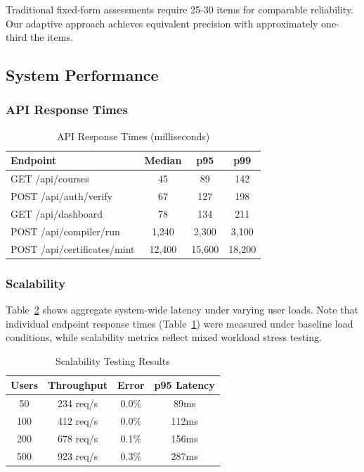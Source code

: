\documentclass[conference]{IEEEtran}
\begin{document}
Traditional fixed-form assessments require 25-30 items for comparable reliability. Our adaptive approach achieves equivalent precision with approximately one-third the items.

\subsection{System Performance}

\subsubsection{API Response Times}

\begin{table}[htbp]
\caption{API Response Times (milliseconds)}
\begin{center}
\begin{tabular}{|l|c|c|c|}
\hline
\textbf{Endpoint} & \textbf{Median} & \textbf{p95} & \textbf{p99} \\
\hline
GET /api/courses & 45 & 89 & 142 \\
\hline
POST /api/auth/verify & 67 & 127 & 198 \\
\hline
GET /api/dashboard & 78 & 134 & 211 \\
\hline
POST /api/compiler/run & 1,240 & 2,300 & 3,100 \\
\hline
POST /api/certificates/mint & 12,400 & 15,600 & 18,200 \\
\hline
\end{tabular}
\label{tab:response}
\end{center}
\end{table}

\subsubsection{Scalability}

Table~\ref{tab:scalability} shows aggregate system-wide latency under varying user loads. Note that individual endpoint response times (Table~\ref{tab:response}) were measured under baseline load conditions, while scalability metrics reflect mixed workload stress testing.

\begin{table}[htbp]
\caption{Scalability Testing Results}
\begin{center}
\begin{tabular}{|c|c|c|c|}
\hline
\textbf{Users} & \textbf{Throughput} & \textbf{Error} & \textbf{p95 Latency} \\
\hline
50 & 234 req/s & 0.0\% & 89ms \\
\hline
100 & 412 req/s & 0.0\% & 112ms \\
\hline
200 & 678 req/s & 0.1\% & 156ms \\
\hline
500 & 923 req/s & 0.3\% & 287ms \\
\hline
\end{tabular}
\label{tab:scalability}
\end{center}
\end{table}
\end{document}
